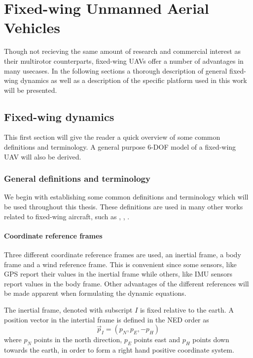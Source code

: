 
\chapter{Fixed-wing Unmanned Aerial Vehicles}\label{cha:fixed_wing_uav}
Though not recieving the same amount of research and commercial interest as their multirotor counterparts,
fixed-wing UAVs offer a number of advantages in many usecases. In the following sections a thorough description of
general fixed-wing dynamics as well as a description of the specific platform used in this work will be presented. 

\section{Fixed-wing dynamics}
This first section will give the reader a quick overview of some common definitions and terminology. 
A general purpose 6-DOF model of a fixed-wing UAV will also be derived. 
\subsection{General definitions and terminology}
We begin with establishing some common definitions and
 terminology which will be used throughout this thesis. These definitions are 
 used in many other works related to fixed-wing aircraft, such as \cite{uav_dynamics_wind}, \cite{uav_dynamics_modeling}, 
\cite{fighter_aircraft_mpc}. 

\subsubsection{Coordinate reference frames}
Three different coordinate reference frames are used, an inertial frame, a body frame and a wind reference frame.
This is convenient since some sensors, like GPS report their values in the inertial frame
 while others, like IMU sensors report values in the body frame. Other advantages of the different references
will be made apparent when formulating the dynamic equations.

\begin{definition}
    The inertial frame, denoted with subscript $I$ is fixed relative to the earth.
    A position vector in the intertial frame is defined in the NED order as
    \begin{equation}
        \vec{p}_I = (p_N, p_E, -p_H)
    \end{equation}
    where $p_N$ points in the north direction, $p_E$ points east and $p_H$ points down towards the earth,
    in order to form a right hand positive coordinate system.
\end{definition}


